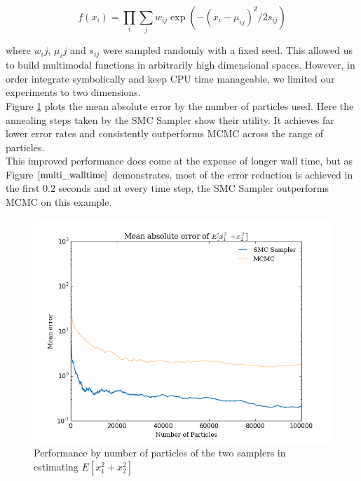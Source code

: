 \documentclass[12pt]{elsarticle}
\begin{document}
\[
f(x_i) = \prod_i \sum_j w_{ij} \exp(-(x_i - \mu_{ij})^2/2s_{ij})
\]

where $w_ij$, $\mu_ij$ and $s_{ij}$ were sampled randomly with a fixed seed. This allowed us to build multimodal functions in arbitrarily high dimensional spaces. However, in order integrate symbolically and keep CPU time manageable, we limited our experiments to two dimensions. \\

Figure \ref{multi_particles} plots the mean absolute error by the number of particles used. Here the annealing steps taken by the SMC Sampler show their utility. It achieves far lower error rates and consistently outperforms MCMC across the range of particles. \\

This improved performance does come at the expense of longer wall time, but as Figure $\ref{multi_walltime}$ demonstrates, most of the error reduction is achieved in the first 0.2 seconds and at every time step, the SMC Sampler outperforms MCMC on this example.

\begin{figure}[htbp]
\begin{center}
\includegraphics[width = \textwidth]{plots/2d-errors.png}
\caption{Performance by number of particles of the two samplers in estimating $E[x_1^2 + x_2^2]$}
\label{multi_particles}
\end{center}
\end{figure}
\end{document}
